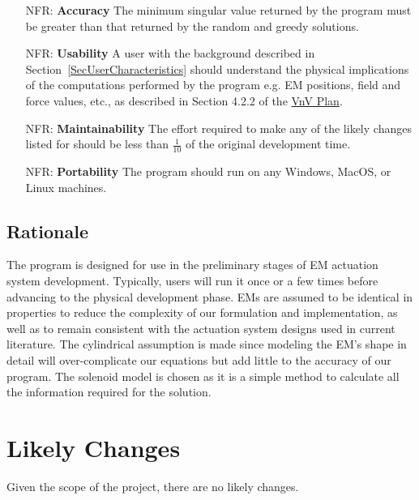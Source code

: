 \documentclass[12pt]{article}
\newcounter{nfrnum} %
\begin{document}
\begin{itemize}

\item[NFR\refstepcounter{nfrnum}\thenfrnum \label{NFR_Accuracy}:]
  \textbf{Accuracy} The minimum singular value returned by the program must be greater than that returned by the random and greedy solutions. 

\item[NFR\refstepcounter{nfrnum}\thenfrnum \label{NFR_Usability}:] \textbf{Usability}
    A user with the background described in Section~\ref{SecUserCharacteristics} should understand the physical implications of the computations performed by the program e.g. EM positions, field and force values, etc., as described in Section 4.2.2 of the \href{https://github.com/husseinsd1/optimal-em-arrangement/blob/main/docs/VnVPlan/VnVPlan.pdf}{VnV Plan}. 

\item[NFR\refstepcounter{nfrnum}\thenfrnum \label{NFR_Maintainability}:]
  \textbf{Maintainability} The effort required to make any of the likely
    changes listed for \progname{} should be less than $\frac{1}{10}$ of the original
    development time.

\item[NFR\refstepcounter{nfrnum}\thenfrnum \label{NFR_Portability}:]
  \textbf{Portability} The program should run on any Windows, MacOS, or Linux machines. 
\end{itemize}

\subsection{Rationale}
The program is designed for use in the preliminary stages of EM actuation system development. Typically, users will run it once or a few times before advancing to the physical development phase. EMs are assumed to be identical in properties to reduce the complexity of our formulation and implementation, as well as to remain consistent with the actuation system designs used in current literature. The cylindrical assumption is made since modeling the EM's shape in detail will over-complicate our equations but add little to the accuracy of our program. The solenoid model is chosen as it is a simple method to calculate all the information required for the solution.  

\section{Likely Changes}    
\noindent
Given the scope of the project, there are no likely changes. 
\end{document}
